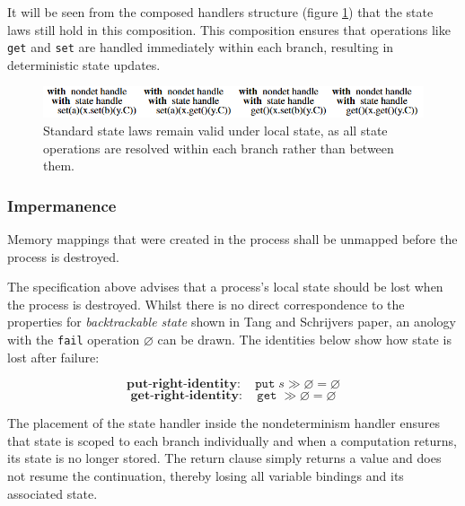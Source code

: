 \documentclass[logo,bsc,singlespacing,parskip]{infthesis}
\begin{document}
It will be seen from the composed handlers structure (figure \ref{fig:local-state-laws}) that the state laws still hold in this composition. This composition ensures that operations like \lstinline{get} and \lstinline{set} are handled immediately within each branch, resulting in deterministic state updates.
\begin{figure}[H]

\centering
\vspace{1em}
\includegraphics[width=1\textwidth]{localStateHandlerComp.png}

\caption{Standard state laws remain valid under local state, as all state operations are resolved within each branch rather than between them.}
\label{fig:local-state-laws}
\end{figure}


\subsubsection{Impermanence} 
\begin{tcolorbox}[colback=gray!10, colframe=gray!60, sharp corners, boxrule=0.5pt, title={POSIX Base Specifications, Issue 7, p.554}]
Memory mappings that were created in the process shall be unmapped before the process
 is destroyed.
 \end{tcolorbox}
 
The specification above advises that a process's local state should be lost when the process is destroyed. Whilst there is no direct correspondence to the properties for \textit{backtrackable state} shown in Tang and Schrijvers paper, an anology with the \lstinline{fail} operation $\varnothing$ can be drawn. The identities below show how state is lost after failure: 

\[
\textbf{put-right-identity}: \quad \texttt{put}\;s \gg \varnothing = \varnothing
\]
\vspace{-1em}
\[
\textbf{get-right-identity}: \quad \texttt{get}\; \gg \varnothing = \varnothing
\]

The placement of the state handler inside the nondeterminism handler ensures that state is scoped to each branch individually and when a computation returns, its state is no longer stored. The return clause  simply returns a value and does not resume the continuation, thereby losing all variable bindings and its associated state. 
\end{document}
